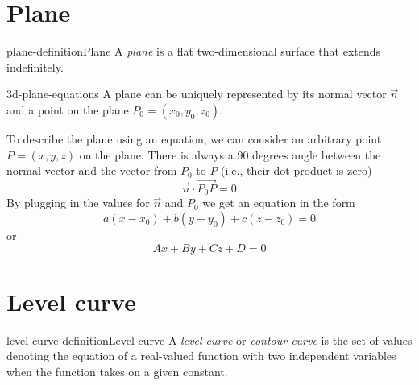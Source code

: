 \documentclass[preview]{standalone}
\begin{document}
\genpage

\section{Plane}

\begin{snippetdefinition}{plane-definition}{Plane}
    A \textit{plane} is a flat two-dimensional surface that extends indefinitely.
\end{snippetdefinition}

\begin{snippet}{3d-plane-equations}
    A plane can be uniquely represented by its
    normal vector \(\vec{n}\)
    and a point on the plane \(P_0=(x_0, y_0, z_0)\).

    To describe the plane using an equation, we can
    consider an arbitrary point \(P=(x,y,z)\) on the plane.
    There is always a 90 degrees angle between the normal
    vector and the vector from \(P_0\) to \(P\) (i.e., their dot product is zero)
    \[
        \vec{n} \cdot \overrightarrow{P_0 P} = 0
    \]
    By plugging in the values for \(\vec{n}\) and \(P_0\)
    we get an equation in the form
    \[
        a(x-x_0) + b(y-y_0) + c(z-z_0) = 0
    \]
    or
    \[
        Ax+By+Cz+D=0
    \]
\end{snippet}

\section{Level curve}


\begin{snippetdefinition}{level-curve-definition}{Level curve}
    A \textit{level curve} or \textit{contour curve}
    is the set of values denoting the equation
    of a real-valued function with two independent variables
    when the function takes on a given constant.
\end{snippetdefinition}


\end{document}
